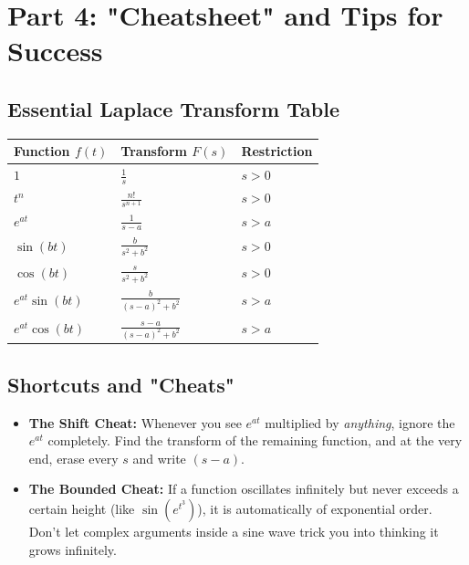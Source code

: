 \documentclass[11pt, a4paper]{article}
\theoremstyle{definition}
\theoremstyle{remark}
\begin{document}
\newpage
\section{Part 4: "Cheatsheet" and Tips for Success}

\subsection{Essential Laplace Transform Table}
\renewcommand{\arraystretch}{1.5}
\begin{center}
\begin{tabularx}{0.8\textwidth}{>{\centering\arraybackslash}X >{\centering\arraybackslash}X >{\centering\arraybackslash}X}
\toprule
\textbf{Function $f(t)$} & \textbf{Transform $F(s)$} & \textbf{Restriction} \\
\midrule
$1$ & $\frac{1}{s}$ & $s > 0$ \\
$t^n$ & $\frac{n!}{s^{n+1}}$ & $s > 0$ \\
$e^{at}$ & $\frac{1}{s - a}$ & $s > a$ \\
$\sin(bt)$ & $\frac{b}{s^2 + b^2}$ & $s > 0$ \\
$\cos(bt)$ & $\frac{s}{s^2 + b^2}$ & $s > 0$ \\
$e^{at} \sin(bt)$ & $\frac{b}{(s - a)^2 + b^2}$ & $s > a$ \\
$e^{at} \cos(bt)$ & $\frac{s - a}{(s - a)^2 + b^2}$ & $s > a$ \\
\bottomrule
\end{tabularx}
\end{center}

\subsection{Shortcuts and "Cheats"}
\begin{itemize}
    \item \textbf{The Shift Cheat:} Whenever you see $e^{at}$ multiplied by \textit{anything}, ignore the $e^{at}$ completely. Find the transform of the remaining function, and at the very end, erase every $s$ and write $(s-a)$.
    \item \textbf{The Bounded Cheat:} If a function oscillates infinitely but never exceeds a certain height (like $\sin(e^{t^3})$), it is automatically of exponential order. Don't let complex arguments inside a sine wave trick you into thinking it grows infinitely.
\end{itemize}
\end{document}
